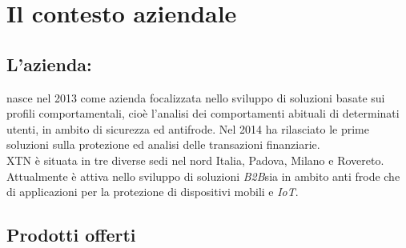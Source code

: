 
\chapter{Il contesto aziendale}
\label{cap:processi-metodologie}

\section{L'azienda: \textbf{\azienda}}
\textbf{\azienda} nasce nel 2013 come azienda focalizzata nello sviluppo di soluzioni basate sui profili comportamentali, cioè l'analisi dei comportamenti abituali di determinati utenti, in ambito di sicurezza ed antifrode. Nel 2014 ha rilasciato le prime soluzioni sulla protezione ed analisi delle transazioni finanziarie.\\
XTN è situata in tre diverse sedi nel nord Italia, Padova, Milano e Rovereto. Attualmente è attiva  nello sviluppo di soluzioni \emph{B2B}\glsfirstoccur sia in ambito anti frode che di applicazioni per la protezione di dispositivi mobili e \textit{IoT}.\\
  
\section{Prodotti offerti}

